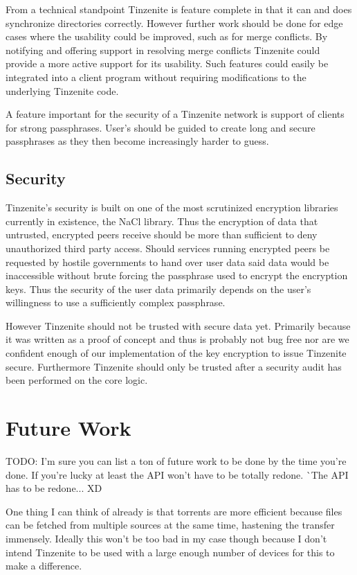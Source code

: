From a technical standpoint Tinzenite is feature complete in that it can and does synchronize directories correctly.
However further work should be done for edge cases where the usability could be improved, such as for merge conflicts.
By notifying and offering support in resolving merge conflicts Tinzenite could provide a more active support for its usability.
Such features could easily be integrated into a client program without requiring modifications to the underlying Tinzenite code.

A feature important for the security of a Tinzenite network is support of clients for strong passphrases.
User's should be guided to create long and secure passphrases as they then become increasingly harder to guess.

\subsection{Security}
\label{sub:Security}

Tinzenite's security is built on one of the most scrutinized encryption libraries currently in existence, the NaCl library.
Thus the encryption of data that untrusted, encrypted peers receive should be more than sufficient to deny unauthorized third party access.
Should services running encrypted peers be requested by hostile governments to hand over user data said data would be inaccessible without brute forcing the passphrase used to encrypt the encryption keys.
Thus the security of the user data primarily depends on the user's willingness to use a sufficiently complex passphrase.

However Tinzenite should not be trusted with secure data yet.
Primarily because it was written as a proof of concept and thus is probably not bug free nor are we confident enough of our implementation of the key encryption to issue Tinzenite secure.
Furthermore Tinzenite should only be trusted after a security audit has been performed on the core logic.

\section{Future Work}
\label{sec:Future Work}

TODO: I'm sure you can list a ton of future work to be done by the time you're done.
If you're lucky at least the API won't have to be totally redone.
^^ The API has to be redone... XD

One thing I can think of already is that torrents are more efficient because files can be fetched from multiple sources at the same time, hastening the transfer immensely.
Ideally this won't be too bad in my case though because I don't intend Tinzenite to be used with a large enough number of devices for this to make a difference.

